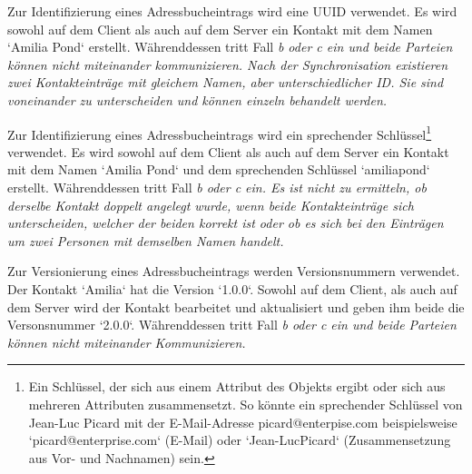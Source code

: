 %
%
\def \naturalkey {Ein Schlüssel, der sich aus einem Attribut des Objekts ergibt oder sich aus mehreren Attributen zusammensetzt. So könnte ein sprechender Schlüssel von Jean-Luc Picard mit der E-Mail-Adresse picard@enterpise.com beispielsweise `picard@enterprise.com` (E-Mail) oder `Jean-LucPicard` (Zusammensetzung aus Vor- und Nachnamen) sein.}
\def \logicalclock {Eine Logische Uhr ist eine Komponente die dazu dient, dem Datenobjekt einen eindeutigen Zeitstempel zuzuweisen. Die bekanntesten Verfahren für Logische Uhren in verteilten Systemen sind die Lamport-Uhr und die Vektoruhr. Beide verwenden Zähler die sich bei jedem Ereignis erhöhen. Einfach gesagt besteht die Lamport-Uhr aus einem Zeitstempel und einem Zähler, die Vektoruhr aus einem Zeitstempel und einem Vektor -- einer Liste aus Zählern.}
%
%
\begin{description}[leftmargin=0.5cm,style=nextline]
  \item[Szenario ID0 -- UUID:]
    Zur Identifizierung eines Adressbucheintrags wird eine \gls{UUID} verwendet. Es wird sowohl auf dem Client als auch auf dem Server ein Kontakt mit dem Namen `Amilia Pond` erstellt.
    Währenddessen tritt Fall \it{b} oder \it{c} ein und beide Parteien können nicht miteinander kommunizieren. Nach der Synchronisation existieren zwei Kontakteinträge mit gleichem Namen, aber unterschiedlicher ID.
    Sie sind voneinander zu unterscheiden und können einzeln behandelt werden.\\
  \item[Szenario ID1 -- sprechender Schlüssel:]
    Zur Identifizierung eines Adressbucheintrags wird ein sprechender Schlüssel\footnote{\naturalkey} verwendet.
    Es wird sowohl auf dem Client als auch auf dem Server ein Kontakt mit dem Namen `Amilia Pond` und dem sprechenden Schlüssel `amiliapond` erstellt. Währenddessen tritt Fall \it{b} oder \it{c} ein.
    Es ist nicht zu ermitteln, ob derselbe Kontakt doppelt angelegt wurde, wenn beide Kontakteinträge sich unterscheiden, welcher der beiden korrekt ist oder ob es sich bei den Einträgen um zwei Personen mit demselben Namen handelt.\\
  \item[Szenario V0 -- Versionsnummer:]
    Zur Versionierung eines Adressbucheintrags werden Versionsnummern verwendet. Der Kontakt `Amilia` hat die Version `1.0.0`.
    Sowohl auf dem Client, als auch auf dem Server wird der Kontakt bearbeitet und aktualisiert und geben ihm beide die Versonsnummer `2.0.0`.
    Währenddessen tritt Fall \it{b} oder \it{c} ein und beide Parteien können nicht miteinander Kommunizieren.

\end{description}
